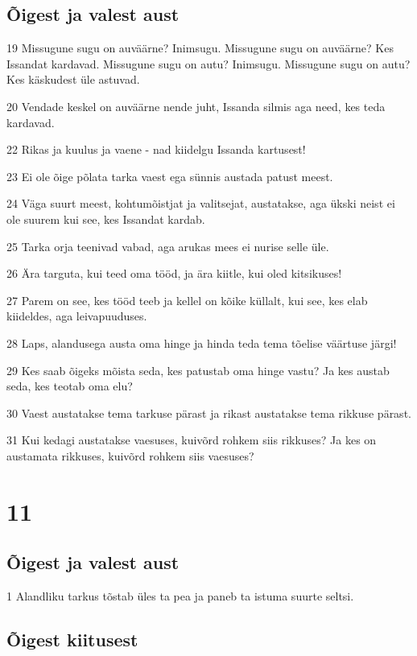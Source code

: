 \section*{Õigest ja valest aust}

\par 19 Missugune sugu on auväärne? Inimsugu. Missugune sugu on auväärne? Kes Issandat kardavad. Missugune sugu on autu? Inimsugu. Missugune sugu on autu? Kes käskudest üle astuvad.
\par 20 Vendade keskel on auväärne nende juht, Issanda silmis aga need, kes teda kardavad.
\par 22 Rikas ja kuulus ja vaene - nad kiidelgu Issanda kartusest!
\par 23 Ei ole õige põlata tarka vaest ega sünnis austada patust meest.
\par 24 Väga suurt meest, kohtumõistjat ja valitsejat, austatakse, aga ükski neist ei ole suurem kui see, kes Issandat kardab.
\par 25 Tarka orja teenivad vabad, aga arukas mees ei nurise selle üle.
\par 26 Ära targuta, kui teed oma tööd, ja ära kiitle, kui oled kitsikuses!
\par 27 Parem on see, kes tööd teeb ja kellel on kõike küllalt, kui see, kes elab kiideldes, aga leivapuuduses.
\par 28 Laps, alandusega austa oma hinge ja hinda teda tema tõelise väärtuse järgi!
\par 29 Kes saab õigeks mõista seda, kes patustab oma hinge vastu? Ja kes austab seda, kes teotab oma elu?
\par 30 Vaest austatakse tema tarkuse pärast ja rikast austatakse tema rikkuse pärast.
\par 31 Kui kedagi austatakse vaesuses, kuivõrd rohkem siis rikkuses? Ja kes on austamata rikkuses, kuivõrd rohkem siis vaesuses?

\chapter{11}

\section*{Õigest ja valest aust}

\par 1 Alandliku tarkus tõstab üles ta pea ja paneb ta istuma suurte seltsi.

\section*{Õigest kiitusest}


